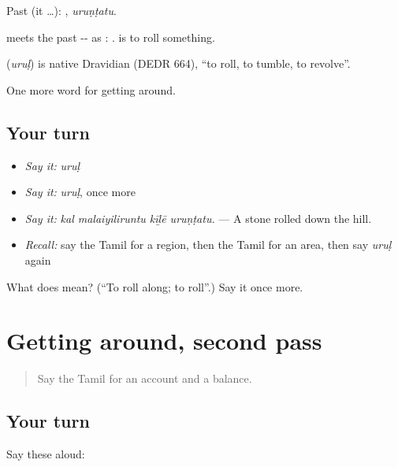 Past (it …): , \emph{uruṇṭatu}.

 meets the past -- as : .  is to roll something.

\begin{cousinweb}
\textbf{} (\emph{uruḷ}) is native Dravidian (DEDR 664), \textquotedblleft{}to roll, to tumble, to revolve\textquotedblright{}.
\end{cousinweb}

\begin{grammarlens}[title={What you've built}]
One more word for getting around.
\end{grammarlens}

\subsection*{Your turn}
\begin{itemize}
\raggedright
  \item \emph{Say it:} \emph{uruḷ}
  \item \emph{Say it:} \emph{uruḷ}, once more
  \item \emph{Say it:} \emph{kal malaiyiliruntu kīḻē uruṇṭatu.} — A stone rolled down the hill.
  \item \emph{Recall:} say the Tamil for a region, then the Tamil for an area, then say \emph{uruḷ} again
\end{itemize}

\begin{tcolorbox}[breakable,colback=teal!4,colframe=teal!35!black,title={Before you move on}]
What does  mean? (\textquotedblleft{}To roll along; to roll\textquotedblright{}.) Say it once more.
\end{tcolorbox}
\section[(dialogue)]{Getting around, second pass}

\label{lesson:TA-R452-review-446-452}



\begin{quote}
Say the Tamil for an account and a balance.
\end{quote}

\subsection*{Your turn}
Say these aloud:

